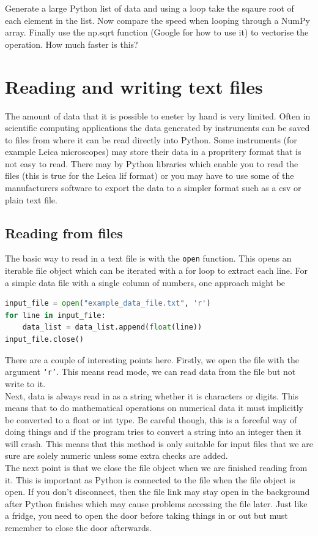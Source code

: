 \begin{task}Generate a large Python list of data and using a loop take the sqaure root of each element in the list. Now compare the speed when looping through a NumPy array. Finally use the np.sqrt function (Google for how to use it) to vectorise the operation. How much faster is this?\end{task} 

\section{Reading and writing text files}
The amount of data that it is possible to eneter by hand is very limited. Often in scientific computing applications the data generated by instruments can be saved to files from where it can be read directly into Python. Some instruments (for example Leica microscopes) may store their data in a propritery format that is not easy to read. There may by Python libraries which enable you to read the files (this is true for the Leica lif format) or you may have to use some of the manufacturers software to export the data to a simpler format such as a csv or plain text file.
	\subsection{Reading from files}
		The basic way to read in a text file is with the \texttt{open} function. This opens an iterable file object which can be iterated with a for loop to extract each line. For a simple data file with a single column of numbers, one approach might be
		\begin{lstlisting}[language=Python]
input_file = open("example_data_file.txt", 'r')
for line in input_file:
	data_list = data_list.append(float(line))
input_file.close()
\end{lstlisting}	
		There are a couple of interesting points here. Firstly, we open the file with the argument \texttt{`r'}. This means read mode, we can read data from the file but not write to it.\\
		Next, data is always read in as a string whether it is characters or digits. This means that to do mathematical operations on numerical data it must implicitly be converted to a float or int type. Be careful though, this is a forceful way of doing things and if the program tries to convert a string into an integer then it will crash. This means that this method is only suitable for input files that we are sure are solely numeric unless some extra checks are added.\\
		The next point is that we close the file object when we are finished reading from it. This is important as Python is connected to the file when the file object is open. If you don't disconnect, then the file link may stay open in the background after Python finishes which may cause problems accessing the file later. Just like a fridge, you need to open the door before taking things in or out but must remember to close the door afterwards.

